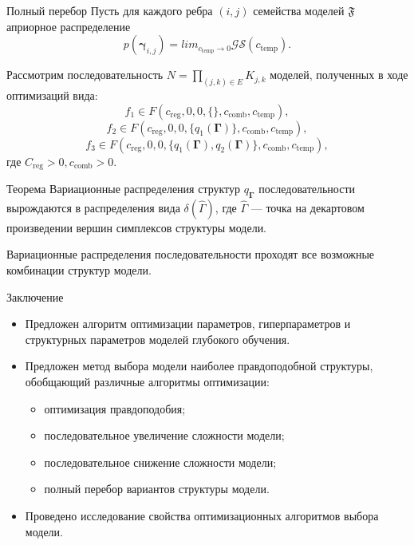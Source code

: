 \documentclass[usenames,dvipsnames,11pt,pdf,utf8,russian,aspectratio=169]{beamer}
\begin{document}
\begin{frame}{Полный перебор}
\small
Пусть для каждого ребра $(i,j)$ семейства моделей $\mathfrak{F}$ априорное распределение $$p(\boldsymbol{\gamma}_{i,j}) =  lim_{c_{\text{temp}} \to 0} \mathcal{GS}(c_{\text{temp}}).$$

Рассмотрим последовательность $N = \prod_{(j,k) \in E} K_{j,k}$ моделей, полученных в ходе оптимизаций вида:
$$f_1 \in F(c_{\text{reg}}, 0, 0, \{\}, c_{\text{comb}},  c_{\text{temp}}),$$
$$f_2 \in F(c_{\text{reg}}, 0, 0, \{q_1(\boldsymbol{\Gamma})\},  c_{\text{comb}},  c_{\text{temp}}),$$
$$f_3 \in F(c_{\text{reg}}, 0, 0, \{q_1(\boldsymbol{\Gamma}), q_2(\boldsymbol{\Gamma})\},  c_{\text{comb}},  c_{\text{temp}}),$$
где $C_{\text{reg}} > 0,  c_{\text{comb}}>0$.


\begin{block}{Теорема}
Вариационные распределения структур $q_{\boldsymbol{\Gamma}}$ последовательности вырождаются в распределения вида $\delta(\hat{\Gamma})$, где $\hat{\Gamma}$ --- точка на декартовом произведении вершин симплексов структуры модели.

Вариационные распределения последовательности проходят все возможные комбинации структур модели.
\end{block}
\end{frame}


\begin{frame}{Заключение}
\begin{itemize}
\item Предложен алгоритм оптимизации параметров, гиперпараметров и структурных
параметров моделей глубокого обучения.
\item Предложен метод выбора модели наиболее правдоподобной структуры, обобщающий различные алгоритмы оптимизации:
\begin{itemize}
\item оптимизация правдоподобия;
\item последовательное увеличение сложности модели;
\item последовательное снижение сложности модели;
\item полный перебор вариантов структуры модели.
\end{itemize}
\item Проведено исследование свойства оптимизационных алгоритмов выбора модели.

\end{itemize}
\end{frame}
\end{document}
